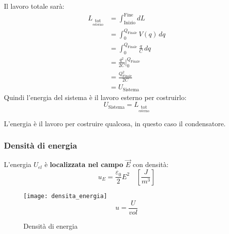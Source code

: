 \documentclass[a4paper]{article}
\begin{document}
Il lavoro totale sarà:
\[
  \begin{aligned}
    L_{\underset{\text{esterno}}{\text{tot}}} &= \int_{\text{Inizio}}^{\text{Fine}} dL\\
                                              &= \int_0^{Q_{\text{Finale}}} V(q) \, dq\\
                                              &= \int_0^{Q_{\text{Finale}}} \frac{q}{C} \, dq\\
                                              &= \frac{q^2}{2C} \Big|_0^{Q_{\text{Finale}}}\\
                                              &= \frac{Q_{\text{Finale}}^2}{2C} \\
                                              &= U_{\text{Sistema}}
  \end{aligned}
\] 
Quindi l'energia del sistema è il lavoro esterno per costruirlo:
\[
  U_{\text{Sistema}} = L_{\underset{\text{esterno}}{\text{tot}}}
\] 

\begin{define}
  L'energia è il lavoro per costruire qualcosa, in questo caso il condensatore.
\end{define}

\subsubsection{Densità di energia}
L'energia \( U_{el} \) è \textbf{localizzata nel campo} \( \vec{E} \) con densità:
\[
  u_E = \frac{\varepsilon_0}{2} E^2 \quad \left[ \frac{J}{m^3} \right]
\] 
\begin{figure}[H]
  \centering
  \texttt{[image: densita\_energia]}
  \[
    u = \frac{U}{vol}
  \] 
  \caption{Densità di energia}
\end{figure}
\end{document}
